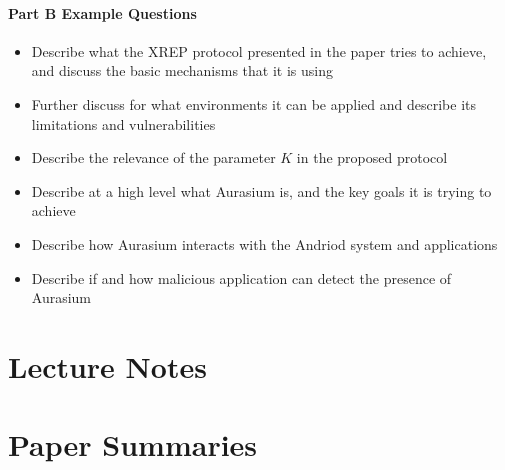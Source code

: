 \documentclass[12pt, a4paper]{report}
\begin{document}
\begin{multicols*}{2}
\subsubsection{Part B Example Questions}
\begin{itemize}
	\item Describe what the XREP protocol presented in the paper tries to achieve, and discuss the basic mechanisms that it is using
	\item Further discuss for what environments it can be applied and describe its limitations and vulnerabilities
	\item Describe the relevance of the parameter $K$ in the proposed protocol
	\item Describe at a high level what Aurasium is, and the key goals it is trying to achieve
	\item Describe how Aurasium interacts with the Andriod system and applications
	\item Describe if and how malicious application can detect the presence of Aurasium
\end{itemize}

\chapter{Lecture Notes}



\chapter{Paper Summaries}































\end{multicols*}
\end{document}
